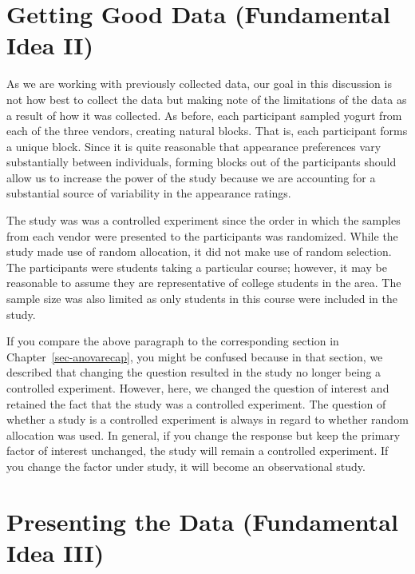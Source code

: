 \documentclass[
  letterpaper,
  DIV=11,
  numbers=noendperiod]{scrreprt}
\theoremstyle{plain}
\theoremstyle{definition}
\theoremstyle{definition}
\theoremstyle{remark}
\begin{document}
\hypertarget{getting-good-data-fundamental-idea-ii-2}{%
\section{Getting Good Data (Fundamental Idea
II)}\label{getting-good-data-fundamental-idea-ii-2}}

As we are working with previously collected data, our goal in this
discussion is not how best to collect the data but making note of the
limitations of the data as a result of how it was collected. As before,
each participant sampled yogurt from each of the three vendors, creating
natural blocks. That is, each participant forms a unique block. Since it
is quite reasonable that appearance preferences vary substantially
between individuals, forming blocks out of the participants should allow
us to increase the power of the study because we are accounting for a
substantial source of variability in the appearance ratings.

The study was was a controlled experiment since the order in which the
samples from each vendor were presented to the participants was
randomized. While the study made use of random allocation, it did not
make use of random selection. The participants were students taking a
particular course; however, it may be reasonable to assume they are
representative of college students in the area. The sample size was also
limited as only students in this course were included in the study.

If you compare the above paragraph to the corresponding section in
Chapter~\ref{sec-anovarecap}, you might be confused because in that
section, we described that changing the question resulted in the study
no longer being a controlled experiment. However, here, we changed the
question of interest and retained the fact that the study was a
controlled experiment. The question of whether a study is a controlled
experiment is always in regard to whether random allocation was used. In
general, if you change the response but keep the primary factor of
interest unchanged, the study will remain a controlled experiment. If
you change the factor under study, it will become an observational
study.

\hypertarget{presenting-the-data-fundamental-idea-iii-2}{%
\section{Presenting the Data (Fundamental Idea
III)}\label{presenting-the-data-fundamental-idea-iii-2}}
\end{document}
